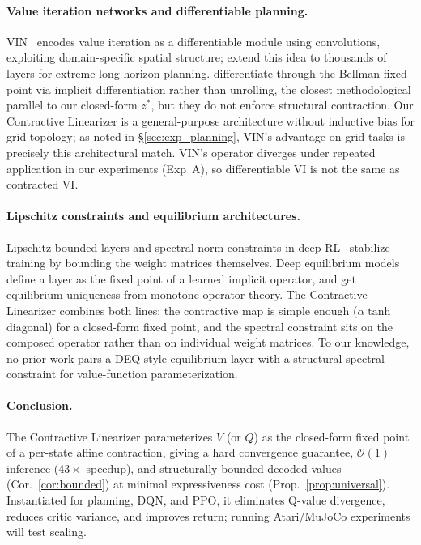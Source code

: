 \documentclass{article}
\newcommand{\zstar}{z^*}                     %
\newcommand{\spb}{\alpha}                    %
\begin{document}
\paragraph{Value iteration networks and differentiable planning.}
VIN~\citep{tamar2016value} encodes value iteration as a differentiable module
using convolutions, exploiting domain-specific spatial structure;
\citet{wang2024scaling} extend this idea to thousands of layers for extreme
long-horizon planning.
\citet{deac2023scaling} differentiate through the Bellman fixed point via
implicit differentiation rather than unrolling, the closest methodological
parallel to our closed-form $\zstar$, but they do not enforce structural
contraction.
Our Contractive Linearizer is a general-purpose architecture without inductive
bias for grid topology; as noted in \S\ref{sec:exp_planning}, VIN's advantage
on grid tasks is precisely this architectural match.
VIN's operator diverges under repeated application in our experiments
(Exp~A), so differentiable VI is not the same as contracted VI.

\paragraph{Lipschitz constraints and equilibrium architectures.}
Lipschitz-bounded layers
\citep{miyato2018spectral,anil2019sorting,wang2023direct} and spectral-norm
constraints in deep RL~\citep{bjorck2021towards} stabilize training by bounding
the weight matrices themselves.
Deep equilibrium models~\citep{bai2019deq} define a layer as the fixed point
of a learned implicit operator, and \citet{winston2020monotone} get
equilibrium uniqueness from monotone-operator theory.
The Contractive Linearizer combines both lines: the contractive map is simple
enough ($\spb\tanh$ diagonal) for a closed-form fixed point, and the spectral
constraint sits on the composed operator rather than on individual weight
matrices.
To our knowledge, no prior work pairs a DEQ-style equilibrium layer with a
structural spectral constraint for value-function parameterization.

\paragraph{Conclusion.}
\label{sec:conclusion}
The Contractive Linearizer parameterizes $V$ (or $Q$) as the closed-form fixed
point of a per-state affine contraction, giving a hard convergence guarantee,
$\mathcal{O}(1)$ inference ($43\times$ speedup), and structurally bounded
decoded values (Cor.~\ref{cor:bounded}) at minimal expressiveness cost
(Prop.~\ref{prop:universal}).
Instantiated for planning, DQN, and PPO, it eliminates Q-value divergence,
reduces critic variance, and improves return; running Atari/MuJoCo
experiments will test scaling.
\end{document}
